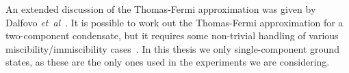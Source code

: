 An extended discussion of the Thomas-Fermi approximation was given by Dalfovo \textit{et~al}~\cite{Dalfovo1999}.
It is possible to work out the Thomas-Fermi approximation for a two-component condensate, but it requires some non-trivial handling of various miscibility/immiscibility cases~\cite{Anderson2010}.
In this thesis we only single-component ground states, as these are the only ones used in the experiments we are considering.
